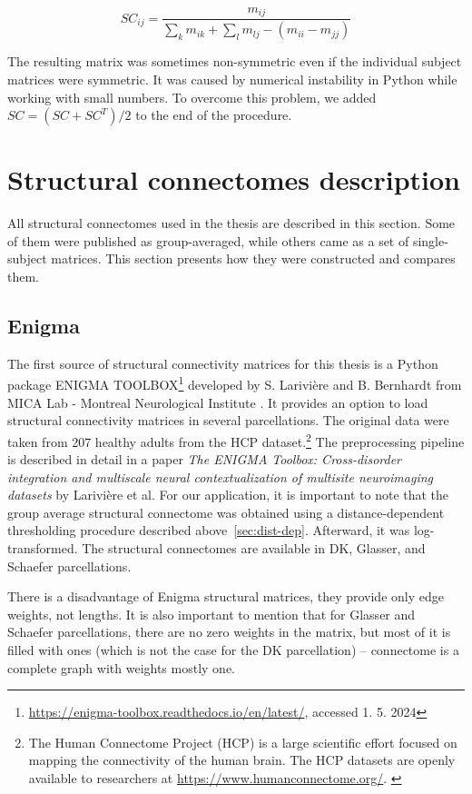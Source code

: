 $$
SC_{ij} = \frac{m_{ij}}{\sum_k m_{ik} + \sum_l m_{lj} - (m_{ii} - m_{jj})}
$$

The resulting matrix was sometimes non-symmetric even if the individual subject matrices were symmetric. It was caused by numerical instability in Python while working with small numbers. To overcome this problem, we added $SC = (SC + SC^T) /2$ to the end of the procedure.

\section{Structural connectomes description}

All structural connectomes used in the thesis are described in this section. Some of them were published as group-averaged, while others came as a set of single-subject matrices. This section presents how they were constructed and compares them. 

\subsection{Enigma}

The first source of structural connectivity matrices for this thesis is a Python package ENIGMA TOOLBOX\footnote{\url{https://enigma-toolbox.readthedocs.io/en/latest/}, accessed 1. 5. 2024} developed by S. Larivière and B. Bernhardt from MICA Lab - Montreal Neurological Institute \cite{lariviere_enigma_2020}. It provides an option to load structural connectivity matrices in several parcellations. The original data were taken from 207 healthy adults from the HCP dataset.\footnote{The Human Connectome Project (HCP) is a large scientific effort focused on mapping the connectivity of the human brain. The HCP datasets are openly available to researchers at \url{https://www.humanconnectome.org/}. \cite{van_essen_human_2012}} The preprocessing pipeline is described in detail in a paper \textit{The ENIGMA Toolbox: Cross-disorder integration and multiscale neural contextualization of multisite neuroimaging datasets} by Larivière et al. For our application, it is important to note that the group average structural connectome was obtained using a distance-dependent thresholding procedure described above~\ref{sec:dist-dep}. Afterward, it was log-transformed. The structural connectomes are available in DK, Glasser, and Schaefer parcellations. 

There is a disadvantage of Enigma structural matrices, they provide only edge weights, not lengths. It is also important to mention that for Glasser and Schaefer parcellations, there are no zero weights in the matrix, but most of it is filled with ones (which is not the case for the DK parcellation) -- connectome is a complete graph with weights mostly one.

